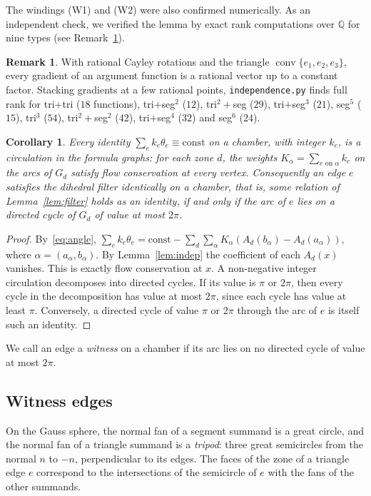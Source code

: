 \documentclass[11pt]{amsart}
\newtheorem{corollary}[thm]{Corollary}
\theoremstyle{definition}
\newtheorem{remark}[thm]{Remark}
\newcommand{\Q}{\mathbb{Q}}
\DeclareMathOperator{\conv}{conv}
\begin{document}
The windings (W1) and (W2) were also confirmed numerically. As an independent check, we verified the lemma
by exact rank computations over $\Q$ for nine types (see Remark~\ref{rem:rank}).

\begin{remark}\label{rem:rank}
With rational Cayley rotations and the triangle $\conv\{e_1,e_2,e_3\}$, every gradient of an argument function
is a rational vector up to a constant factor. Stacking gradients at a few rational points, \texttt{independence.py}
finds full rank for tri$+$tri ($18$ functions), tri$+$seg$^2$ ($12$), tri$^2+$seg ($29$), tri$+$seg$^3$ ($21$),
seg$^5$ ($15$), tri$^3$ ($54$), tri$^2+$seg$^2$ ($42$), tri$+$seg$^4$ ($32$) and seg$^6$ ($24$).
\end{remark}

\begin{corollary}\label{cor:circ}
Every identity $\sum_e k_e\theta_e\equiv\mathrm{const}$ on a chamber, with integer $k_e$, is a circulation in the formula
graphs: for each zone $d$, the weights $K_\alpha=\sum_{e\text{ on }\alpha}k_e$ on the arcs of $G_d$ satisfy flow
conservation at every vertex. Consequently an edge $e$ satisfies the dihedral filter identically on a chamber,
that is, some relation of Lemma~\ref{lem:filter} holds as an identity, if and only if the arc of $e$ lies on a directed
cycle of $G_d$ of value at most $2\pi$.
\end{corollary}
\begin{proof}
By~\eqref{eq:angle}, $\sum_e k_e\theta_e = \mathrm{const}-\sum_d\sum_\alpha K_\alpha(A_d(b_\alpha)-A_d(a_\alpha))$, where
$\alpha=(a_\alpha,b_\alpha)$. By Lemma~\ref{lem:indep} the coefficient of each $A_d(x)$ vanishes. This is exactly flow
conservation at $x$. A non-negative integer circulation decomposes into directed cycles. If its value is
$\pi$ or $2\pi$, then every cycle in the decomposition has value at most $2\pi$, since each cycle has value at least
$\pi$. Conversely, a directed cycle of value $\pi$ or $2\pi$ through the arc of $e$ is itself such an identity.
\end{proof}

We call an edge a \emph{witness} on a chamber if its arc lies on no directed cycle of value at most $2\pi$.

\subsection{Witness edges}
On the Gauss sphere, the normal fan of a segment summand is a great circle, and the normal fan of a triangle summand is a
\emph{tripod}: three great semicircles from the normal $n$ to $-n$, perpendicular to its edges. The faces of the zone of a
triangle edge $e$ correspond to the intersections of the semicircle of $e$ with the fans of the other summands.
\end{document}
